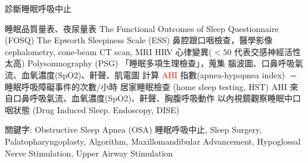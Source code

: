 \documentclass[aspectratio=169]{beamer}
\begin{document}
\begin{frame}{診斷睡眠呼吸中止}

    \begin{outline}
    \1 睡眠品質量表、夜尿量表
        \2 The Functional Outcomes of Sleep Questionnaire (FOSQ)
        \2 The Epworth Sleepiness Scale (ESS)
    \1 鼻腔跟口咽檢查，醫學影像
        \2 cephalometry, cone-beam CT scan, MRI
    \1 HRV 心律變異($\less 50$ 代表交感神經活性太高)
    \1 Polysomnography (PSG) 「睡眠多項生理檢查」，蒐集
        \2 腦波圖、口鼻呼吸氣流、血氧濃度(SpO2)、鼾聲、肌電圖
        \2 計算 \textcolor{red}{AHI} 指數(apnea-hypopnea index) $=$ 睡眠呼吸障礙事件的次數/小時
    \1 居家睡眠檢查 (home sleep testing, HST)
        \2 AHI 來自口鼻呼吸氣流、血氧濃度(SpO2)、鼾聲、胸腹呼吸動作
    \1 以內視鏡觀察睡眠中口咽狀態 (Drug Induced Sleep. Endoscopy, DISE) 
    \end{outline}
    
    \begin{block}{關鍵字:}
\footnotesize{
Obstructive Sleep Apnea (OSA) 睡眠呼吸中止, Sleep Surgery, Palatopharyngoplasty, Algorithm, Maxillomandibular Advancement, Hypoglossal Nerve Stimulation, Upper Airway Stimulation}  
    \end{block}


\end{frame}
\end{document}

